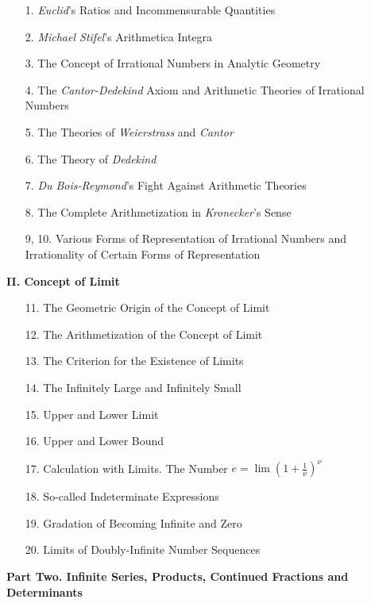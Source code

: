 {\fontsize{10}{0}\selectfont
\begin{enumerate}[itemsep=-1pt]
    \item[1.] \textit{Euclid}'s Ratios and Incommensurable Quantities
    \item[2.] \textit{Michael Stifel}'s Arithmetica Integra
    \item[3.] The Concept of Irrational Numbers in Analytic Geometry
    \item[4.] The \textit{Cantor-Dedekind} Axiom and Arithmetic Theories of Irrational Numbers
    \item[5.] The Theories of \textit{Weierstrass} and \textit{Cantor}
    \item[6.] The Theory of \textit{Dedekind}
    \item[7.] \textit{Du Bois-Reymond}'s Fight Against Arithmetic Theories
    \item[8.] The Complete Arithmetization in \textit{Kronecker}'s Sense
    \item[9, 10.] Various Forms of Representation of Irrational Numbers and Irrationality of Certain Forms of Representation
\end{enumerate}
\begin{center}
    \textbf{\small{II. Concept of Limit}}
\end{center}
\begin{enumerate}[itemsep=-1pt]
    \item[11.] The Geometric Origin of the Concept of Limit
    \item[12.] The Arithmetization of the Concept of Limit
    \item[13.] The Criterion for the Existence of Limits
    \item[14.] The Infinitely Large and Infinitely Small
    \item[15.] Upper and Lower Limit
    \item[16.] Upper and Lower Bound
    \item[17.] Calculation with Limits. The Number $e=\lim(1+\frac{1}{\nu})^\nu$
    \item[18.] So-called Indeterminate Expressions
    \item[19.] Gradation of Becoming Infinite and Zero
    \item[20.] Limits of Doubly-Infinite Number Sequences
\end{enumerate}
\vspace{0.2cm}
\begin{center}
    \textbf{\small{Part Two. Infinite Series, Products, Continued Fractions and Determinants}}
    \vspace{0.2cm}


\end{center}}
